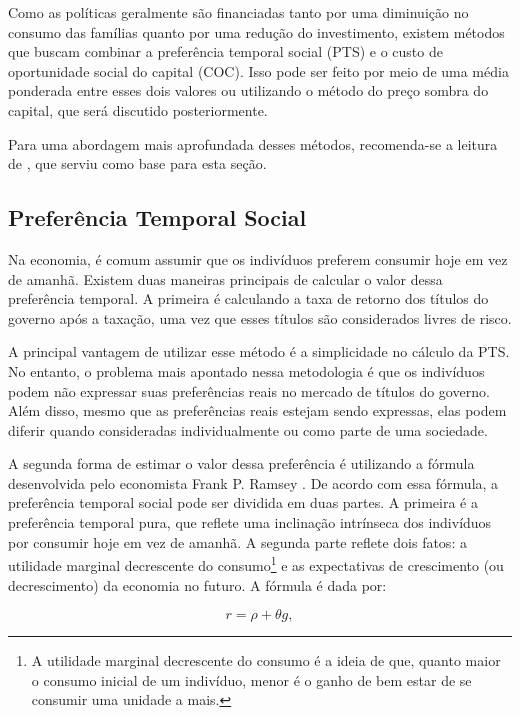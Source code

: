 \documentclass[12pt,letterpaper]{article}
\newcommand{\1}{\mathbbm{1}}
\numberwithin{equation}{section}
\begin{document}
Como as políticas geralmente são financiadas tanto por uma diminuição no consumo das famílias quanto por uma redução do investimento, existem métodos que buscam combinar a preferência temporal social (PTS) e o custo de oportunidade social do capital (COC). Isso pode ser feito por meio de uma média ponderada entre esses dois valores ou utilizando o método do preço sombra do capital, que será discutido posteriormente.

Para uma abordagem mais aprofundada desses métodos, recomenda-se a leitura de \cite{zhuang_theory_nodate}, que serviu como base para esta seção.

\subsection{Preferência Temporal Social}

Na economia, é comum assumir que os indivíduos preferem consumir hoje em vez de amanhã. Existem duas maneiras principais de calcular o valor dessa preferência temporal. A primeira é calculando a taxa de retorno dos títulos do governo após a taxação, uma vez que esses títulos são considerados livres de risco.

A principal vantagem de utilizar esse método é a simplicidade no cálculo da PTS. No entanto, o problema mais apontado nessa metodologia é que os indivíduos podem não expressar suas preferências reais no mercado de títulos do governo. Além disso, mesmo que as preferências reais estejam sendo expressas, elas podem diferir quando consideradas individualmente ou como parte de uma sociedade.

A segunda forma de estimar o valor dessa preferência é utilizando a fórmula desenvolvida pelo economista Frank P. Ramsey \cite{ramsey1928mathematical}. De acordo com essa fórmula, a preferência temporal social pode ser dividida em duas partes. A primeira é a preferência temporal pura, que reflete uma inclinação intrínseca dos indivíduos por consumir hoje em vez de amanhã. A segunda parte reflete dois fatos: a utilidade marginal decrescente do consumo\footnote{A utilidade marginal decrescente do consumo é a ideia de que, quanto maior o consumo inicial de um indivíduo, menor é o ganho de bem estar de se consumir uma unidade a mais.} e as expectativas de crescimento (ou decrescimento) da economia no futuro. A fórmula é dada por:

\begin{equation}
    r = \rho + \theta g,
\end{equation}
\end{document}

